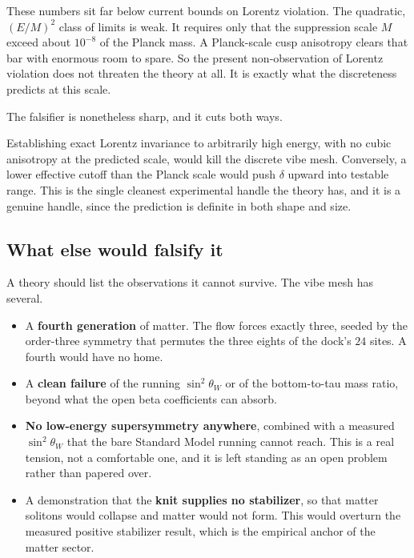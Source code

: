 These numbers sit far below current bounds on Lorentz violation. The quadratic, $(E/M)^2$ class of limits is weak. It requires only that the suppression scale $M$ exceed about $10^{-8}$ of the Planck mass. A Planck-scale cusp anisotropy clears that bar with enormous room to spare. So the present non-observation of Lorentz violation does not threaten the theory at all. It is exactly what the discreteness predicts at this scale.

The falsifier is nonetheless sharp, and it cuts both ways.

\begin{principle}
Establishing exact Lorentz invariance to arbitrarily high energy, with no cubic anisotropy at the predicted scale, would kill the discrete vibe mesh. Conversely, a lower effective cutoff than the Planck scale would push $\delta$ upward into testable range. This is the single cleanest experimental handle the theory has, and it is a genuine handle, since the prediction is definite in both shape and size.
\end{principle}

\subsection{What else would falsify it}

A theory should list the observations it cannot survive. The vibe mesh has several.

\begin{itemize}
\item A \textbf{fourth generation} of matter. The flow forces exactly three, seeded by the order-three symmetry that permutes the three eights of the dock's $24$ sites. A fourth would have no home.
\item A \textbf{clean failure} of the running $\sin^2\theta_W$ or of the bottom-to-tau mass ratio, beyond what the open beta coefficients can absorb.
\item \textbf{No low-energy supersymmetry anywhere}, combined with a measured $\sin^2\theta_W$ that the bare Standard Model running cannot reach. This is a real tension, not a comfortable one, and it is left standing as an open problem rather than papered over.
\item A demonstration that the \textbf{knit supplies no stabilizer}, so that matter solitons would collapse and matter would not form. This would overturn the measured positive stabilizer result, which is the empirical anchor of the matter sector.
\end{itemize}

